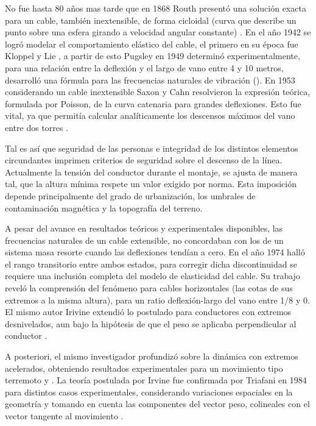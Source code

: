 No fue hasta 80 años mas tarde que en 1868 Routh presentó una solución exacta para un cable, también inextensible, de forma cicloidal (curva que describe un punto sobre una esfera girando a velocidad angular constante) \cite{Routh1955}. En el año 1942 se logró modelar el comportamiento elástico del cable, el primero en su época fue Kloppel y Lie \citep{Kloppel1942}, a partir de esto Pugsley en 1949 determinó experimentalmente, para una relación entre la deflexión y el largo de vano entre 4 y 10 metros, desarrolló una fórmula para las frecuencias naturales de vibración (\cite{Pugsley1949}). En 1953 considerando un cable inextensible Saxon y Cahn resolvieron la expresión teórica, formulada por Poisson, de la curva catenaria para grandes deflexiones. Esto fue vital, ya que permitía calcular analíticamente los descensos máximos del vano entre dos torres \cite{Saxon1953}.

Tal es así que seguridad de las personas e integridad de los distintos elementos circundantes imprimen criterios de seguridad sobre el descenso de la línea. Actualmente la tensión del conductor durante el montaje, se ajusta de manera tal, que la altura mínima respete un valor exigido por norma. Esta imposición depende principalmente del grado de urbanización, los umbrales de contaminación magnética y la topografía del terreno.   

A pesar del avance en resultados teóricos y experimentales disponibles, las frecuencias naturales de un cable extensible, no concordaban con los de un sistema masa resorte cuando las deflexiones tendían a cero. En el año 1974 \cite{Irvine1974} halló el rango transitorio entre ambos estados, para corregir dicha discontinuidad se requiere una inclusión completa del modelo de elasticidad del cable. Su trabajo reveló la comprensión del fenómeno para cables horizontales (las cotas de sus extremos a la misma altura), para un ratio deflexión-largo del vano entre 1/8 y 0. El mismo autor Irivine extendió lo postulado para conductores con extremos desnivelados, aun bajo la hipótesis de que el peso se aplicaba perpendicular al conductor \citep{Irvine1974}.

A posteriori, el mismo investigador profundizó sobre la dinámica con extremos acelerados, obteniendo resultados experimentales para un movimiento tipo terremoto \citep{Irvine1976} y \citep{Irvine1978}. La teoría postulada por Irvine fue confirmada por Triafani en 1984 para distintos casos experimentales,  considerando variaciones espaciales en la geometría y tomando en cuenta las componentes del vector peso, colineales con el vector tangente al movimiento \cite{Triantafyllou1984}.


